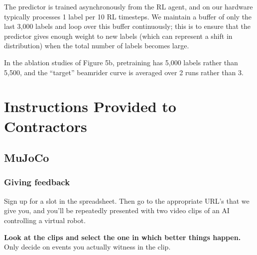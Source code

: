 \documentclass{article}
\begin{document}
The predictor is trained asynchronously from the RL agent, and on our hardware typically processes 1 label per 10 RL timesteps.  We maintain a buffer of only the last 3,000 labels and loop over this buffer continuously; this is to ensure that the predictor gives enough weight to new labels (which can represent a shift in distribution) when the total number of labels becomes large.

In the ablation studies of Figure 5b, pretraining has 5,000 labels rather than 5,500, 
and the ``target'' beamrider curve is averaged over 2 runs rather than 3.



\section{Instructions Provided to Contractors}
\label{app:instructions}


\subsection{MuJoCo}


\subsubsection*{Giving feedback}

Sign up for a slot in the spreadsheet.
Then go to the appropriate URL's that we give you,
and you'll be repeatedly presented with two video clips of an AI controlling a virtual robot.

\textbf{Look at the clips and select the one in which better things happen.}
Only decide on events you actually witness in the clip.
\end{document}
